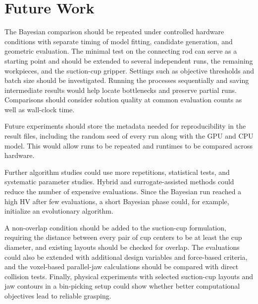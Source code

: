 \section{Future Work}

The Bayesian comparison should be repeated under controlled hardware conditions
with separate timing of model fitting, candidate generation, and geometric
evaluation. The minimal test on the connecting rod can serve as a starting point
and should be extended to several independent runs, the remaining workpieces, and
the suction-cup gripper. Settings such as objective thresholds and batch size
should be investigated. Running the processes sequentially and saving
intermediate results would help locate bottlenecks and preserve partial runs.
Comparisons should consider solution quality at common evaluation counts as well
as wall-clock time.

Future experiments should store the metadata needed for reproducibility in the
result files, including the random seed of every run along with the GPU and CPU model. This would allow runs
to be repeated and runtimes to be compared across hardware.

Further algorithm studies could use more repetitions, statistical tests, and
systematic parameter studies. Hybrid and surrogate-assisted methods could reduce
the number of expensive evaluations. Since the Bayesian run reached a high HV
after few evaluations, a short Bayesian phase could, for example, initialize an
evolutionary algorithm.

A non-overlap condition should be added to the suction-cup formulation, requiring
the distance between every pair of cup centers to be at least the cup diameter,
and existing layouts should be checked for overlap. The evaluations could also be
extended with additional design variables and force-based criteria, and the
voxel-based parallel-jaw calculations should be compared with direct collision
tests. Finally, physical experiments with selected suction-cup layouts and jaw
contours in a bin-picking setup could show whether better computational
objectives lead to reliable grasping.